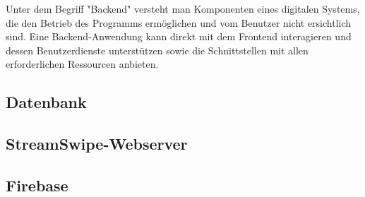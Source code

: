 Unter dem Begriff "Backend" versteht man Komponenten eines digitalen Systems, die den Betrieb des Programms ermöglichen und vom Benutzer nicht ersichtlich sind.
\newline
Eine Backend-Anwendung kann direkt mit dem Frontend interagieren und dessen Benutzerdienste unterstützen sowie die Schnittstellen mit allen erforderlichen Ressourcen anbieten.

\subsection{Datenbank}


\subsection{StreamSwipe-Webserver}




\subsection{Firebase}
\label{sec:implementierung_firebase}

